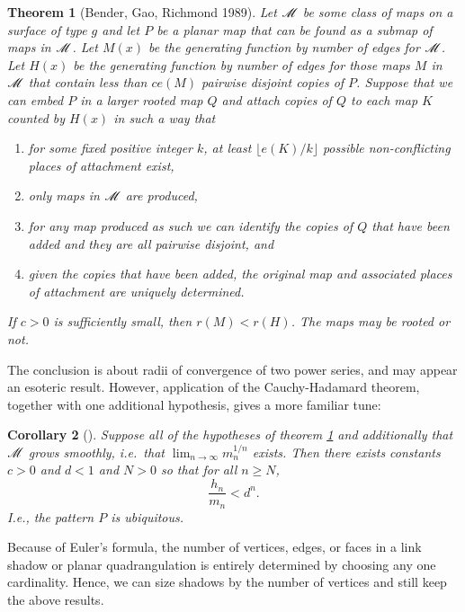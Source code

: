 \documentclass[amsmath,longbibliography,secnumarabic,floatfix,amssymb,nofootinbib,nobibnotes,letterpaper,11pt,notitlepage,tightenlines]{revtex4-1}
\newtheorem{theorem}{Theorem}
\newtheorem{corollary}[theorem]{Corollary}
\begin{document}
\begin{theorem}[Bender, Gao, Richmond 1989] Let $\mathscr{M}$ be some class of maps on a surface of
  type $g$ and let $P$ be a planar map that can be found as a submap of maps in $\mathscr{M}$. Let
  $M(x)$ be the generating function by number of edges for $\mathscr{M}$. Let $H(x)$ be the generating
  function by number of edges for those maps $M$ in $\mathscr{M}$ that contain less than $ce(M)$
  pairwise disjoint copies of $P$. Suppose that we can embed $P$ in a larger rooted map $Q$ and
  attach copies of $Q$ to each map $K$ counted by $H(x)$ in such a way that
  \begin{enumerate}
  \item for some fixed positive integer $k$, at least $\lfloor e(K)/k \rfloor$ possible
    non-conflicting places of attachment exist,
  \item only maps in $\mathscr{M}$ are produced,
  \item for any map produced as such we can identify the copies of $Q$ that have been added and they
    are all pairwise disjoint, and
  \item given the copies that have been added, the original map and associated places of attachment
    are uniquely determined.
  \end{enumerate} If $c > 0$ is sufficiently small, then $r(M) < r(H)$. The maps may be rooted or
  not.
  \label{thr:weakpattern}
\end{theorem}

The conclusion is about radii of convergence of two power series, and may appear an esoteric
result. However, application of the Cauchy-Hadamard theorem, together with one additional
hypothesis, gives a more familiar tune:

\begin{corollary}[\cite{Bender1992104}]
  Suppose all of the hypotheses of theorem \ref{thr:weakpattern} and additionally that $\mathscr{M}$
  grows smoothly, i.e.\ that $\lim_{n\to\infty}{m_n^{1/n}}$ exists. Then there exists constants $c >
  0$ and $d < 1$ and $N > 0$ so that for all $n \ge N$,
  \[ \frac{h_n}{m_n} < d^n. \]
  I.e., the pattern $P$ is \emph{ubiquitous}.
\end{corollary}

Because of Euler's formula, the number of vertices, edges, or faces in a link shadow or planar
quadrangulation is entirely determined by choosing any one cardinality. Hence, we can size shadows
by the number of vertices and still keep the above results.
\end{document}
